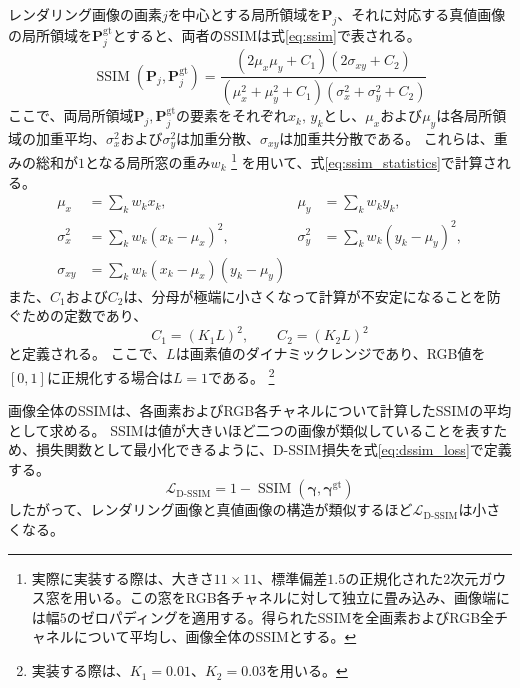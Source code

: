 \documentclass[dvipdfmx]{jlreq}
\newcommand{\LDSSIM}{\mathcal{L}_{\mathrm{D\text{-}SSIM}}}
\begin{document}
レンダリング画像の画素$j$を中心とする局所領域を$\bm{P}_j$、それに対応する真値画像の局所領域を$\bm{P}_j^{\mathrm{gt}}$とすると、両者のSSIMは式\eqref{eq:ssim}で表される。
\begin{equation}
    \operatorname{SSIM}(\bm{P}_j,\bm{P}_j^{\mathrm{gt}}) = \frac{ (2\mu_x\mu_y+C_1) (2\sigma_{xy}+C_2) }{ (\mu_x^2+\mu_y^2+C_1) (\sigma_x^2+\sigma_y^2+C_2) }
    \label{eq:ssim}
\end{equation}
ここで、両局所領域$\bm{P}_j,\bm{P}_j^{\mathrm{gt}}$の要素をそれぞれ$x_k,\,y_k$とし、$\mu_x$および$\mu_y$は各局所領域の加重平均、$\sigma_x^2$および$\sigma_y^2$は加重分散、$\sigma_{xy}$は加重共分散である。
これらは、重みの総和が$1$となる局所窓の重み$w_k$
\footnote{実際に実装する際は、大きさ$11\times11$、標準偏差$1.5$の正規化された2次元ガウス窓を用いる。この窓をRGB各チャネルに対して独立に畳み込み、画像端には幅$5$のゼロパディングを適用する。得られたSSIMを全画素およびRGB全チャネルについて平均し、画像全体のSSIMとする。}
を用いて、式\eqref{eq:ssim_statistics}で計算される。
\begin{equation}
    \begin{aligned}
        \mu_x &= \sum_k w_k x_k, & \mu_y &= \sum_k w_k y_k, \\
        \sigma_x^2 &= \sum_k w_k(x_k-\mu_x)^2, & \sigma_y^2 &= \sum_k w_k(y_k-\mu_y)^2, \\
        \sigma_{xy} &= \sum_k w_k (x_k-\mu_x)(y_k-\mu_y)
    \end{aligned}
    \label{eq:ssim_statistics}
\end{equation}
また、$C_1$および$C_2$は、分母が極端に小さくなって計算が不安定になることを防ぐための定数であり、
\begin{equation}
    C_1=(K_1L)^2, \qquad C_2=(K_2L)^2
    \label{eq:ssim_constants}
\end{equation}
と定義される。
ここで、$L$は画素値のダイナミックレンジであり、RGB値を$[0,1]$に正規化する場合は$L=1$である。
\footnote{実装する際は、$K_1=0.01$、$K_2=0.03$を用いる。}

画像全体のSSIMは、各画素およびRGB各チャネルについて計算したSSIMの平均として求める。
SSIMは値が大きいほど二つの画像が類似していることを表すため、損失関数として最小化できるように、D-SSIM損失を式\eqref{eq:dssim_loss}で定義する。
\begin{equation}
    \LDSSIM = 1-\operatorname{SSIM}\left( \bm{\gamma}, \bm{\gamma}^{\mathrm{gt}} \right)
    \label{eq:dssim_loss}
\end{equation}
したがって、レンダリング画像と真値画像の構造が類似するほど$\LDSSIM$は小さくなる。
\end{document}
